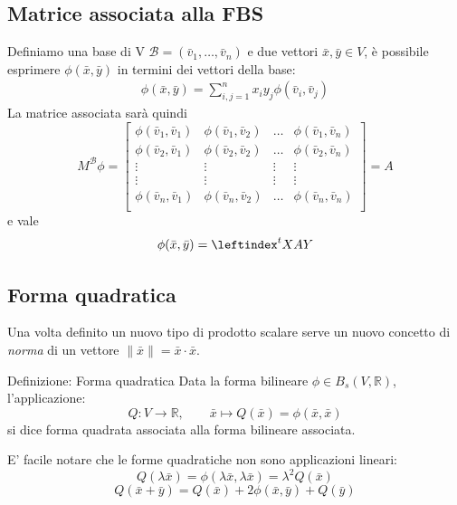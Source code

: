 \documentclass[x11names]{article}
\begin{document}
\subsection{Matrice associata alla FBS}
Definiamo una base di V $\mathcal{B} = \left(\bar{v}_{1},\dots,\bar{v}_{n}\right)$ e due vettori $\bar{x},\bar{y}\in V$, è possibile esprimere $\phi (\bar{x},\bar{y})$ in termini dei vettori della base:
\begin{align*}
	\phi(\bar{x},\bar{y}) = \sum_{i,j=1}^{n}x_{i}y_{j}\phi(\bar{v}_{i},\bar{v}_{j})
\end{align*}
La matrice associata sarà quindi
\[
M^{\mathcal{B}}\phi = 
\begin{bmatrix}
	\phi(\bar{v}_{1},\bar{v}_{1}) & \phi(\bar{v}_{1},\bar{v}_{2}) & \dots & \phi(\bar{v}_{1},\bar{v}_{n})  \\
	\phi(\bar{v}_{2},\bar{v}_{1}) & \phi(\bar{v}_{2},\bar{v}_{2}) & \dots & \phi(\bar{v}_{2},\bar{v}_{n})  \\
	\vdots & \vdots & \vdots & \vdots \\
	\vdots & \vdots & \vdots & \vdots \\
	\phi(\bar{v}_{n},\bar{v}_{1}) & \phi(\bar{v}_{n},\bar{v}_{2}) & \dots & \phi(\bar{v}_{n},\bar{v}_{n})  \\
\end{bmatrix} = A
\]
e vale
\[
\phi(\bar{x},\bar{y}) = \leftindex^{t}{X}AY
\]

\subsection{Forma quadratica}
Una volta definito un nuovo tipo di prodotto scalare serve un nuovo concetto di \textit{norma} di un vettore $\|\bar{x}\| = \bar{x} \cdot \bar{x}$.
	\begin{center}
	\colorbox{myblue}{\begin{minipage}{5.75in}
			\begin{blues}{Definizione: Forma quadratica}
			Data la forma bilineare $\phi \in B_{s}(V,\mathbb{R})$, l'applicazione:
			\[
			Q:V\to \mathbb{R}, \qquad \bar{x} \mapsto Q(\bar{x}) = \phi(\bar{x},\bar{x})
			\]
			si dice forma quadrata associata alla forma bilineare associata.
			\end{blues}
	\end{minipage}}       
\end{center}

E' facile notare che le forme quadratiche non sono applicazioni lineari:
\[
Q(\lambda\bar{x}) = \phi(\lambda\bar{x},\lambda\bar{x}) = \lambda^2Q(\bar{x})
\]
\[
Q(\bar{x} + \bar{y}) = Q(\bar{x}) + 2\phi(\bar{x},\bar{y}) + Q(\bar{y})
\]
\end{document}

